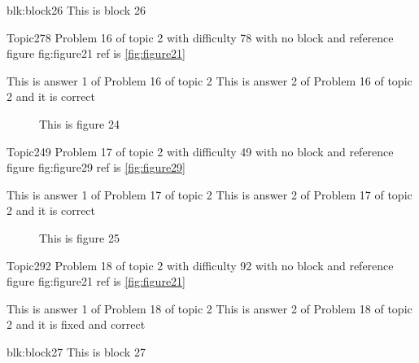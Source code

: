 \documentclass[master]{exam}
\begin{document}
\begin{block}{blk:block26}
This is block 26
\end{block}


\begin{problem}{Topic2}{78}
	Problem 16 of topic 2 with difficulty 78 with no block and reference figure fig:figure21 ref is \ref{fig:figure21}
	\begin{answers}
		\answer This is answer 1 of Problem 16 of topic 2 
		\answer[correct] This is answer 2 of Problem 16 of topic 2 and it is correct
	\end{answers}
\end{problem}



\begin{figure}
	\begin{center}
		This is figure 24 
		\label{fig:figure24}
	\end{center}
\end{figure}

\begin{problem}{Topic2}{49}
	Problem 17 of topic 2 with difficulty 49 with no block and reference figure fig:figure29 ref is \ref{fig:figure29}
	\begin{answers}
		\answer This is answer 1 of Problem 17 of topic 2 
		\answer[correct] This is answer 2 of Problem 17 of topic 2 and it is correct
	\end{answers}
\end{problem}



\begin{figure}
	\begin{center}
		This is figure 25 
		\label{fig:figure25}
	\end{center}
\end{figure}

\begin{problem}{Topic2}{92}
	Problem 18 of topic 2 with difficulty 92 with no block and reference figure fig:figure21 ref is \ref{fig:figure21}
	\begin{answers}
		\answer This is answer 1 of Problem 18 of topic 2 
		 This is answer 2 of Problem 18 of topic 2 and it is fixed and correct
	\end{answers}
\end{problem}



\begin{block}{blk:block27}
This is block 27
\end{block}
\end{document}
